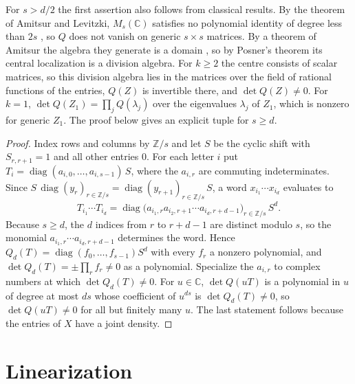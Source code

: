 \documentclass[11pt]{article}
\theoremstyle{remark}
\newcommand{\C}{\mathbb C}
\newcommand{\Z}{\mathbb Z}
\DeclareMathOperator{\diag}{diag}
\begin{document}
For $s>d/2$ the first assertion also follows from classical results. By the theorem of Amitsur and Levitzki, $M_s(\C)$ satisfies no polynomial identity of degree less than $2s$ \cite[Corollary~V.5.3]{Ar}, so $Q$ does not vanish on generic $s\times s$ matrices. By a theorem of Amitsur the algebra they generate is a domain \cite[Theorem~V.10.4]{Ar}, so by Posner's theorem \cite[Theorem~V.8.1]{Ar} its central localization is a division algebra. For $k\ge2$ the centre consists of scalar matrices, so this division algebra lies in the matrices over the field of rational functions of the entries, $Q(Z)$ is invertible there, and $\det Q(Z)\ne0$. For $k=1$, $\det Q(Z_1)=\prod_jQ(\lambda_j)$ over the eigenvalues $\lambda_j$ of $Z_1$, which is nonzero for generic $Z_1$. The proof below gives an explicit tuple for $s\ge d$.

\begin{proof}
Index rows and columns by $\Z/s$ and let $S$ be the cyclic shift with $S_{r,r+1}=1$ and all other entries $0$. For each letter $i$ put $T_i=\diag(a_{i,0},\dots,a_{i,s-1})\,S$, where the $a_{i,r}$ are commuting indeterminates. Since $S\,\diag(y_r)_{r\in\Z/s}=\diag(y_{r+1})_{r\in\Z/s}\,S$, a word $x_{i_1}\cdots x_{i_d}$ evaluates to
\[
T_{i_1}\cdots T_{i_d}=\diag\bigl(a_{i_1,r}a_{i_2,r+1}\cdots a_{i_d,r+d-1}\bigr)_{r\in\Z/s}\,S^d .
\]
Because $s\ge d$, the $d$ indices from $r$ to $r+d-1$ are distinct modulo $s$, so the monomial $a_{i_1,r}\cdots a_{i_d,r+d-1}$ determines the word. Hence $Q_d(T)=\diag(f_0,\dots,f_{s-1})S^d$ with every $f_r$ a nonzero polynomial, and $\det Q_d(T)=\pm\prod_rf_r\ne0$ as a polynomial. Specialize the $a_{i,r}$ to complex numbers at which $\det Q_d(T)\ne0$. For $u\in\C$, $\det Q(uT)$ is a polynomial in $u$ of degree at most $ds$ whose coefficient of $u^{ds}$ is $\det Q_d(T)\ne0$, so $\det Q(uT)\ne0$ for all but finitely many $u$. The last statement follows because the entries of $X$ have a joint density.
\end{proof}

\section{Linearization}\label{sec:lin}
\end{document}
